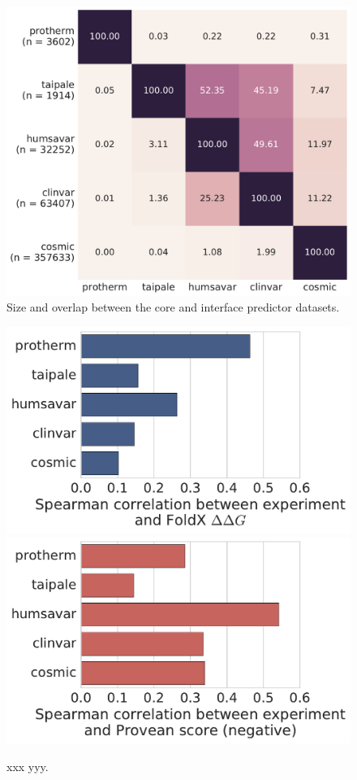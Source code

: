 
\begin{figure}[ht]
	\centering
	\includegraphics[width=1\textwidth]{figures/elaspic_training_set/core_data_statistics/training_set_overlap_final.pdf}
	\caption{Size and overlap between the core and interface predictor datasets.}
\end{figure}


\begin{figure}[ht]
	\centering
	\includegraphics[width=1\textwidth]{figures/elaspic_training_set/core_data_statistics/foldx_correlation_final.pdf}
	\includegraphics[width=1\textwidth]{figures/elaspic_training_set/core_data_statistics/provean_correlation_final.pdf}
	\caption{xxx yyy.}
\end{figure}
